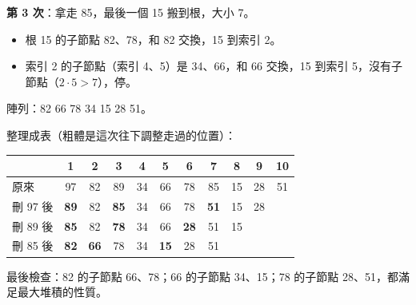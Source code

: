 \begin{pastsoln}
\textbf{第 3 次}：拿走 85，最後一個 15 搬到根，大小 7。
\begin{itemize}[nosep]
\item 根 15 的子節點 82、78，和 82 交換，15 到索引 2。
\item 索引 2 的子節點（索引 4、5）是 34、66，和 66 交換，15 到索引 5，沒有子節點（$2\cdot 5 > 7$），停。
\end{itemize}
陣列：82 66 78 34 15 28 51。

整理成表（粗體是這次往下調整走過的位置）：
\begin{center}
\begin{tabular}{lcccccccccc}
\toprule
 & 1 & 2 & 3 & 4 & 5 & 6 & 7 & 8 & 9 & 10 \\
\midrule
原來 & 97 & 82 & 89 & 34 & 66 & 78 & 85 & 15 & 28 & 51 \\
刪 97 後 & \textbf{89} & 82 & \textbf{85} & 34 & 66 & 78 & \textbf{51} & 15 & 28 & \\
刪 89 後 & \textbf{85} & 82 & \textbf{78} & 34 & 66 & \textbf{28} & 51 & 15 & & \\
刪 85 後 & \textbf{82} & \textbf{66} & 78 & 34 & \textbf{15} & 28 & 51 & & & \\
\bottomrule
\end{tabular}
\end{center}
最後檢查：82 的子節點 66、78；66 的子節點 34、15；78 的子節點 28、51，都滿足最大堆積的性質。
\end{pastsoln}
